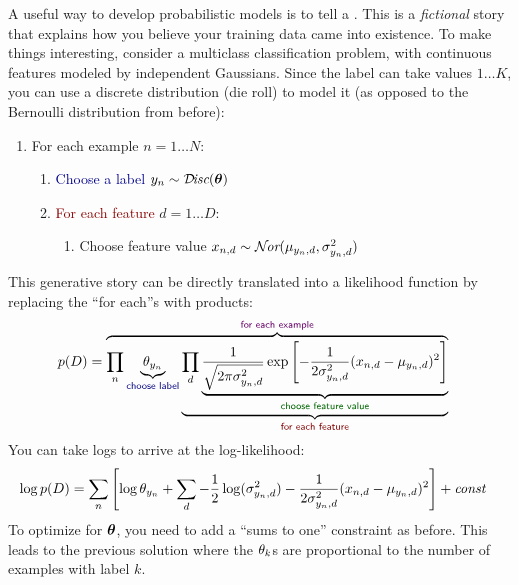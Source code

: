 A useful way to develop probabilistic models is to tell a
.  This is a \emph{fictional} story that
explains how you believe your training data came into existence.  To
make things interesting, consider a multiclass classification problem,
with continuous features modeled by independent Gaussians.  Since the
label can take values $1 \dots K$, you can use a discrete
distribution (die roll) to model it (as opposed to the Bernoulli
distribution from before):
%
\begin{enumerate}
  \item \textcolor{darkpurple}{For each example} $n = 1 \dots N$:
    \begin{enumerate}
      \item \textcolor{darkblue}{Choose a label} $y_n \sim \mathcal{D}\hspace{-0.5mm}\textit{isc}(\boldsymbol{\theta})$
      \item \textcolor{darkred}{For each feature} $d = 1 \dots D$:
        \begin{enumerate}
          \item \textcolor{darkergreen}{Choose feature value} $x_{n,d} \sim \mathcal{N}\hspace{-0.5mm}\textit{or}(\mu_{y_n,d}, \sigma^2_{y_n,d})$
         \end{enumerate}
     \end{enumerate}
\end{enumerate}
%
This generative story can be directly translated into a likelihood
function by replacing the ``for each''s with products:
%
\begin{align}
  p(D)
  &=  \overbrace{
      \prod_n
       \underbrace{\th_{y_n}}_{\textsf{\textcolor{darkblue}{choose label}}}
       \underbrace{
       \prod_d
         \underbrace{\frac 1 {\sqrt{2 \pi \si_{y_n,d}^2}}
         \exp\left[
           -\frac 1 {2 \si_{y_n,d}^2} (x_{n,d} - \mu_{y_n,d})^2
           \right]}_{\textsf{\textcolor{darkergreen}{choose feature value}}}
         }_{\textsf{\textcolor{darkred}{for each feature}}}}
       ^{\textsf{\textcolor{darkpurple}{for each example}}}
\end{align}
%
You can take logs to arrive at the log-likelihood:
%
\begin{align}
\log p(D)
&= 
\sum_n
  \left[
    \log \theta_{y_n} + 
    \sum_d
      -\frac 1 2 \log(\sigma_{y_n,d}^2)
      -\frac 1 {2 \sigma_{y_n,d}^2} (x_{n,d} - \mu_{y_n,d})^2
      \right]
  + \textit{const}
\end{align}
%
To optimize for $\boldsymbol{\theta}$, you need to add a ``sums to one''
constraint as before.  This leads to the previous solution where the
$\theta_k$s are proportional to the number of examples with label $k$.
